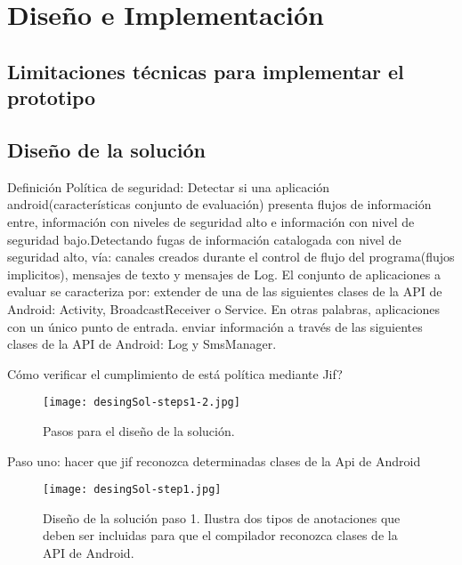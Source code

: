 \label{ch:desing}
\chapter{Diseño e Implementación}

\section{Limitaciones técnicas para implementar el prototipo}

\section{Diseño de la solución} 
Definición Política de seguridad:\newline
Detectar si una aplicación android(características conjunto de evaluación)
presenta flujos de información entre, información con niveles de seguridad alto
e información con nivel de seguridad bajo.\newline Detectando fugas de
información catalogada con nivel de seguridad alto, vía: canales creados durante
el control de flujo del programa(flujos implicitos), mensajes de texto y
mensajes de Log. \newline
El conjunto de aplicaciones a evaluar se caracteriza por:\newline
extender de una de las siguientes clases de la API de Android: Activity,
BroadcastReceiver o Service. En otras palabras, aplicaciones con un único punto
de entrada. \newline 
enviar información a través de las siguientes clases de la
API de Android: Log y SmsManager.\newline



Cómo verificar el cumplimiento de está política mediante
Jif?
\newline \begin{figure}[h!]
	\begin{center}
	\texttt{[image: desingSol-steps1-2.jpg]}
	\end{center}
	\caption{Pasos para el diseño de la solución.}
	\label{fig:desingSol-steps1-2}
\end{figure}

Paso uno: hacer que jif reconozca determinadas clases de la Api de
Android\newline 

\begin{figure}[h!]
	\begin{center}
	\texttt{[image: desingSol-step1.jpg]}
	\end{center}
	\caption{Diseño de la solución paso 1. Ilustra dos tipos de anotaciones que
	deben ser incluidas para que el compilador reconozca clases de la API de
	Android.}
	\label{fig:desingSol-step1}
\end{figure}

